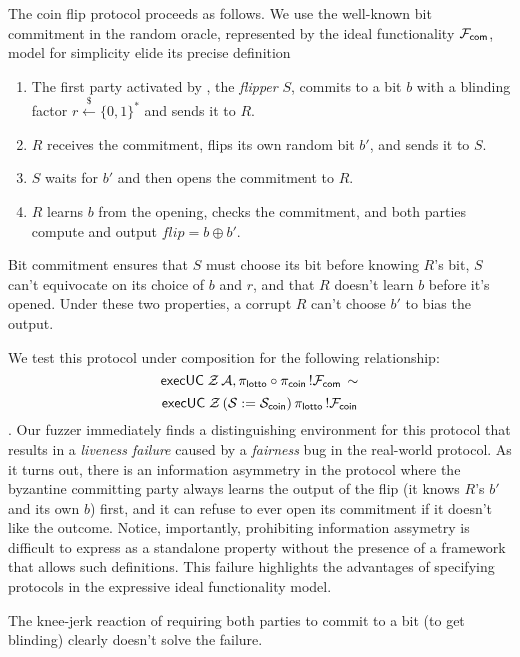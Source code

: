 {The coin flip protocol proceeds as follows. We use the well-known bit commitment in the random oracle,
represented by the ideal functionality $\mathcal{F}_{{\mathsf {com}}}$, model for simplicity  elide its precise definition
\begin{enumerate}
    \item The first party activated by \Z, the \emph{flipper} $S$, commits to a bit
        $b$ with a blinding factor $r \xleftarrow{\$} \{0,1\}^*$ and sends it to $R$.  
    \item $R$ receives the commitment, flips its own random bit $b'$, and sends it to
        $S$.
    \item $S$ waits for $b'$ and then opens the commitment to $R$.
    \item $R$ learns $b$ from the opening, checks the commitment, and both
        parties compute and output $flip = b \oplus b'$.
\end{enumerate}
Bit commitment ensures that $S$ must choose its bit before knowing $R$'s bit, 
$S$ can't equivocate on its choice of $b$ and $r$, and that
$R$ doesn't learn $b$ before it's opened. Under these two properties, a corrupt $R$ can't
choose $b'$ to bias the output.

We test this protocol under composition for the following relationship:
$${\mathsf {execUC}} \; \mathcal{Z} \, \mathcal{A}, \pi_{{\mathsf {lotto}}} \circ \pi_{{\mathsf {coin}}} \, !\mathcal{F}_{{\mathsf {com}}} \, \sim$$ 
$${\mathsf {execUC}} \; \mathcal{Z} \, (\mathcal{S} := \mathcal{S}_{{\mathsf {coin}}}) \, \pi_{{\mathsf {lotto}}} \, !\mathcal{F}_{{\mathsf {coin}}}$$.
Our fuzzer immediately finds a distinguishing environment
for this protocol that results in a \emph{liveness failure} caused by a
\emph{fairness} bug in the real-world protocol. As it turns out, there is an information asymmetry 
in the protocol where the byzantine committing party always learns the output of the flip
(it knows $R$'s $b'$ and its own $b$) first, and it can refuse to ever open its commitment
if it doesn't like the outcome. Notice, importantly, prohibiting information assymetry
is difficult to express as a standalone property without the presence of a framework
that allows such definitions. This failure highlights the advantages of specifying protocols
in the expressive ideal functionality model.

The knee-jerk reaction of requiring both parties to commit to a bit (to get blinding) clearly
doesn't solve the failure.

}
